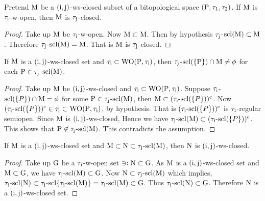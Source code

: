 \begin{thm}\label{thm7.2.33}
Pretend $\mathrm{M}$ be a $(\mathrm{i}, \mathrm{j})$-ws-closed subset of a bitopological space $(\mathrm{P}, \tau_1, \tau_2 )$. If $\mathrm{M}$ is $\tau_{\mathrm{i}}$-w-open, then $\mathrm{M}$ is $\tau_{\mathrm{j}}$-closed.
\end{thm}

\begin{proof}
Take up $\mathrm{M}$ be $\tau_{\mathrm{i}}$-w-open. Now $\mathrm{M}\subset \mathrm{M}$. Then by hypothesis $\tau_{\mathrm{j}}$-$\mathrm{scl}(\mathrm{M}) \subset \mathrm{M}$. Therefore $\tau_{\mathrm{j}}$-$\mathrm{scl}(\mathrm{M}) = \mathrm{M}$. That is $\mathrm{M}$ is $\tau_{\mathrm{j}}$-closed.
\end{proof}

\begin{thm}\label{thm7.2.34}
If $\mathrm{M}$ is a $(\mathrm{i}, \mathrm{j})$-ws-closed set and $\tau_{\mathrm{i}} \subset \mathrm{WO}(\mathrm{P}, \tau_{\mathrm{i}} )$, then $\tau_{\mathrm{j}}$-$\mathrm{scl}(\{\mathrm{P}\}) \cap \mathrm{M} \neq \phi$ for each $\mathrm{P} \in \tau_{\mathrm{j}}$-$\mathrm{scl}(\mathrm{M})$.
\end{thm}

\begin{proof}
Take up $\mathrm{M}$ be $(\mathrm{i}, \mathrm{j})$-ws-closed and $\tau_{\mathrm{i}} \subset \mathrm{WO}(\mathrm{P}, \tau_{\mathrm{i}} )$. Suppose $\tau_{\mathrm{i}}$-$\mathrm{scl}(\{P\}) \cap \mathrm{M} = \phi$ for some $\mathrm{P} \in \tau_{\mathrm{j}}$-$\mathrm{scl}(\mathrm{M})$, then $\mathrm{M} \subset (\tau_{\mathrm{i}}\text{-scl}(\{P\}))^{\text{c}}$. Now $(\tau_{\mathrm{i}}\text{-scl}(\{P\}))^{\text{c}} \in\tau_{\mathrm{i}} \subset \mathrm{WO}(\mathrm{P}, \tau_{\mathrm{i}} )$, by hypothesis. That is $(\tau_{\mathrm{i}}\text{-scl}(\{P\}))^{\text{c}}$ is $\tau_{\mathrm{i}}$-regular semiopen. Since $\mathrm{M}$ is $(\mathrm{i}, \mathrm{j})$-ws-closed, Hence we have $\tau_{\mathrm{j}}\text{-scl}(\mathrm{M}) \subset (\tau_{\mathrm{i}}\text{-scl}(\{P\}))^{\text{c}}$. This shows that $\mathrm{P} \not\in \tau_{\mathrm{j}}\text{-scl}(\mathrm{M})$. This contradicts the assumption.
\end{proof}

\begin{thm}\label{thm7.2.35}
If $\mathrm{M}$ is a $(\mathrm{i}, \mathrm{j})$-ws-closed set and $\mathrm{M} \subset \mathrm{N} \subset \tau_{\mathrm{j}}\text{-scl}(\mathrm{M})$, then $\mathrm{N}$ is $(\mathrm{i}, \mathrm{j})$-ws-closed.
\end{thm}

\begin{proof}
Take up $\mathrm{G}$ be a $\tau_{\mathrm{i}}$-w-open set $\ni: \mathrm{N} \subset \mathrm{G}$. As $\mathrm{M}$ is a $(\mathrm{i}, \mathrm{j})$-ws-closed set and $\mathrm{M} \subset \mathrm{G}$, we have $\tau_{\mathrm{j}}\text{-scl}(\mathrm{M}) \subset \mathrm{G}$. Now $\mathrm{N} \subset \tau_{\mathrm{j}}\text{-scl}(\mathrm{M})$ which implies, $\tau_{\mathrm{j}}\text{-scl}(\mathrm{N}) \subset \tau_{\mathrm{j}}\text{-scl}\{\tau_{\mathrm{j}}\text{-scl}(\mathrm{M})\}= \tau_{\mathrm{j}}\text{-scl}(\mathrm{M}) \subset \mathrm{G}$. Thus $\tau_{\mathrm{j}}\text{-scl}(\mathrm{N}) \subset \mathrm{G}$. Therefore $\mathrm{N}$ is a $(\mathrm{i}, \mathrm{j})$-ws-closed set.
\end{proof}

